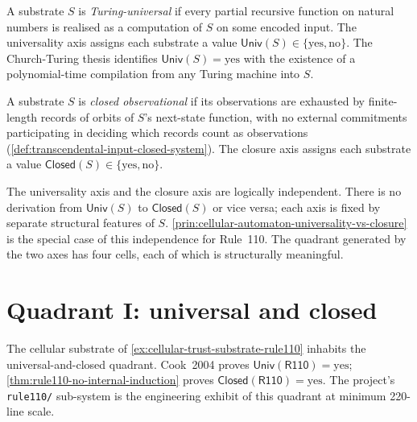 \begin{definition}
\label{def:quadrant-universality-axis}
A substrate $S$ is \emph{Turing-universal} if every partial recursive function on natural numbers is realised as a computation of $S$ on some encoded input. The universality axis assigns each substrate a value $\mathsf{Univ}(S) \in \{\text{yes}, \text{no}\}$. The Church-Turing thesis identifies $\mathsf{Univ}(S) = \text{yes}$ with the existence of a polynomial-time compilation from any Turing machine into $S$.
\end{definition}

\begin{definition}
\label{def:quadrant-closure-axis}
A substrate $S$ is \emph{closed observational} if its observations are exhausted by finite-length records of orbits of $S$'s next-state function, with no external commitments participating in deciding which records count as observations (\autoref{def:transcendental-input-closed-system}). The closure axis assigns each substrate a value $\mathsf{Closed}(S) \in \{\text{yes}, \text{no}\}$.
\end{definition}

\begin{principle}
\label{prin:quadrant-axes-independent}
The universality axis and the closure axis are logically independent. There is no derivation from $\mathsf{Univ}(S)$ to $\mathsf{Closed}(S)$ or vice versa; each axis is fixed by separate structural features of $S$. \autoref{prin:cellular-automaton-universality-vs-closure} is the special case of this independence for Rule~110. The quadrant generated by the two axes has four cells, each of which is structurally meaningful.
\end{principle}

\section{Quadrant I: universal and closed}
\label{sec:quadrant-universal-closed}

\begin{example}
\label{ex:quadrant-rule110-as-uc}
The cellular substrate of \autoref{ex:cellular-trust-substrate-rule110} inhabits the universal-and-closed quadrant. Cook~2004 proves $\mathsf{Univ}(\mathsf{R110}) = \text{yes}$; \autoref{thm:rule110-no-internal-induction} proves $\mathsf{Closed}(\mathsf{R110}) = \text{yes}$. The project's \texttt{rule110/} sub-system is the engineering exhibit of this quadrant at minimum 220-line scale.
\end{example}

